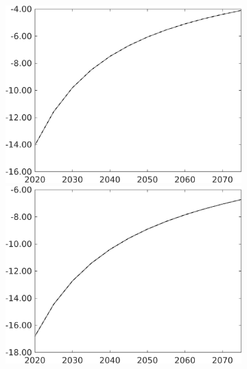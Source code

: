 \begin{figure}[h!!]
\begin{subfigure}{0.75\textwidth}
\begin{minipage}[]{0.32\textwidth}
			\end{minipage}
		\begin{minipage}[]{0.32\textwidth}
		\includegraphics[width=1\textwidth]{../../codding_model/own_basedOnFried/optimalPol_010922_revision/figures/all_13Sept22/PerdifNoTauf_Equlab_regime5_CompTaul_snS_spillover0_nsk0_xgr0_knspil0_sep0_LFlimit0_emsbase0_countec0_GovRev0_etaa0.79_lgd0.png}
	\end{minipage}
\begin{minipage}[]{0.32\textwidth}
\includegraphics[width=1\textwidth]{../../codding_model/own_basedOnFried/optimalPol_010922_revision/figures/all_13Sept22/PerdifNoTauf_Equlab_regime5_CompTaul_sn_spillover0_nsk0_xgr0_knspil0_sep0_LFlimit0_emsbase0_countec0_GovRev0_etaa0.79_lgd0.png}
\end{minipage}
		\end{subfigure} 
		

\end{figure}
